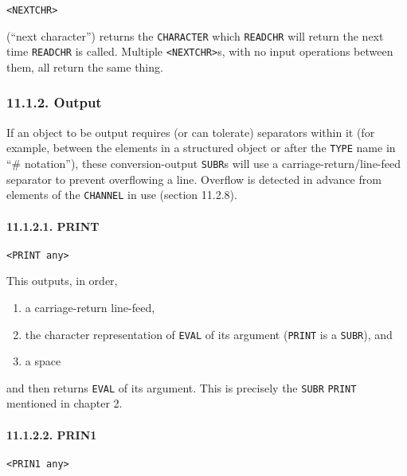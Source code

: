 \documentclass[a4paper,]{article}
\providecommand{\tightlist}{%
  \setlength{\itemsep}{0pt}\setlength{\parskip}{0pt}}
\let\oldparagraph\paragraph
\renewcommand{\paragraph}[1]{\oldparagraph{#1}\mbox{}}
\begin{document}
\begin{verbatim}
<NEXTCHR>
\end{verbatim}

 (``next character'') returns the \texttt{CHARACTER} which \texttt{READCHR} will return the
next time \texttt{READCHR} is called. Multiple \texttt{\textless{}NEXTCHR\textgreater{}}s, with no input operations between
them, all return the same thing.

\subsubsection{11.1.2. Output}\label{output}

If an object to be output requires (or can tolerate) separators within it (for example, between the elements in a
structured object or after the \texttt{TYPE} name in ``\# notation''), these conversion-output \texttt{SUBR}s will use a
carriage-return/line-feed separator to prevent overflowing a line. Overflow is detected in advance from elements of the
\texttt{CHANNEL} in use (section 11.2.8).

\paragraph{11.1.2.1. PRINT}\label{print}

\begin{verbatim}
<PRINT any>
\end{verbatim}

 This outputs, in order,

\begin{enumerate}
\def\labelenumi{\arabic{enumi}.}
\tightlist
\item
  a carriage-return line-feed,
\item
  the character representation of \texttt{EVAL} of its argument (\texttt{PRINT} is a \texttt{SUBR}), and
\item
  a space
\end{enumerate}

and then returns \texttt{EVAL} of its argument. This is precisely the \texttt{SUBR} \texttt{PRINT} mentioned in chapter 2.

\paragraph{11.1.2.2. PRIN1}\label{prin1}

\begin{verbatim}
<PRIN1 any>
\end{verbatim}
\end{document}
